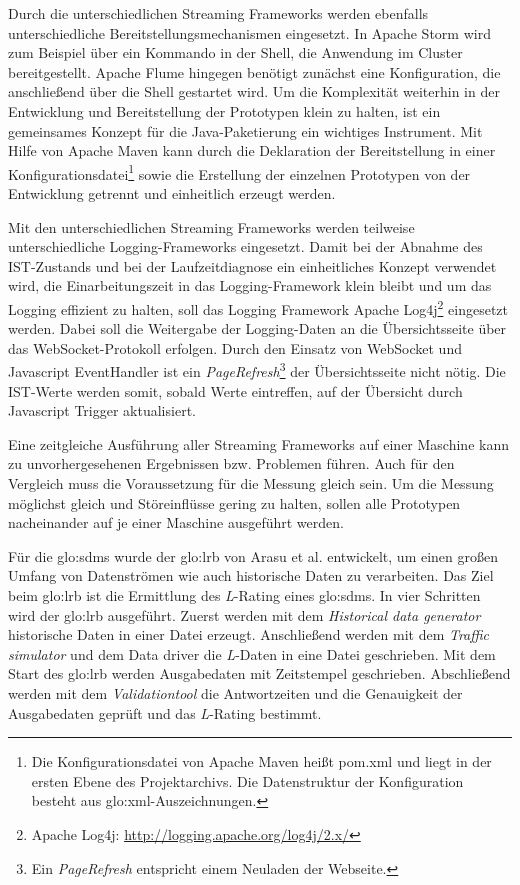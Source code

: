 Durch die unterschiedlichen Streaming Frameworks werden ebenfalls unterschiedliche Bereitstellungsmechanismen eingesetzt. In Apache Storm wird zum Beispiel über ein Kommando in der Shell, die Anwendung im Cluster bereitgestellt. Apache Flume hingegen benötigt zunächst eine Konfiguration, die anschließend über die Shell gestartet wird. Um die Komplexität weiterhin in der Entwicklung und Bereitstellung der Prototypen klein zu halten, ist ein gemeinsames Konzept für die Java-Paketierung ein wichtiges Instrument. Mit Hilfe von Apache Maven kann durch die Deklaration der Bereitstellung in einer Konfigurationsdatei\footnote{Die Konfigurationsdatei von Apache Maven heißt pom.xml und liegt in der ersten Ebene des Projektarchivs. Die Datenstruktur der Konfiguration besteht aus \gls{glo:xml}-Auszeichnungen. } sowie die Erstellung der einzelnen Prototypen von der Entwicklung getrennt und einheitlich erzeugt werden.

Mit den unterschiedlichen Streaming Frameworks werden teilweise unterschiedliche Logging-Frameworks eingesetzt. Damit bei der Abnahme des IST-Zustands und bei der Laufzeitdiagnose ein einheitliches Konzept verwendet wird, die Einarbeitungszeit in das Logging-Framework klein bleibt und um das Logging effizient zu halten, soll das Logging Framework Apache Log4j\footnote{Apache Log4j: \url{http://logging.apache.org/log4j/2.x/}} eingesetzt werden. Dabei soll die Weitergabe der Logging-Daten an die Übersichtsseite über das WebSocket-Protokoll erfolgen. Durch den Einsatz von WebSocket und Javascript EventHandler ist ein \textit{PageRefresh}\footnote{Ein \textit{PageRefresh} entspricht einem Neuladen der Webseite.} der Übersichtsseite nicht nötig. Die IST-Werte werden somit, sobald Werte eintreffen, auf der Übersicht durch Javascript Trigger aktualisiert.

Eine zeitgleiche Ausführung aller Streaming Frameworks auf einer Maschine kann zu unvorhergesehenen Ergebnissen bzw. Problemen führen. Auch für den Vergleich muss die Voraussetzung für die Messung gleich sein. Um die Messung möglichst gleich und Störeinflüsse gering zu halten, sollen alle Prototypen nacheinander auf je einer Maschine ausgeführt werden.

Für die \gls{glo:sdms} wurde der \gls{glo:lrb} von Arasu et al.  entwickelt, um einen großen Umfang von Datenströmen wie auch historische Daten zu verarbeiten. Das Ziel beim \gls{glo:lrb} ist die Ermittlung des \textit{L}-Rating eines \gls{glo:sdms}. In vier Schritten wird der \gls{glo:lrb} ausgeführt. Zuerst werden mit dem \textit{Historical data generator} historische Daten in einer Datei erzeugt. Anschließend werden mit dem \textit{Traffic simulator} und dem Data driver die \textit{L}-Daten in eine Datei geschrieben. Mit dem Start des \gls{glo:lrb} werden Ausgabedaten mit Zeitstempel geschrieben. Abschließend werden mit dem \textit{Validationtool} die Antwortzeiten und die Genauigkeit der Ausgabedaten geprüft und das \textit{L}-Rating bestimmt. 

